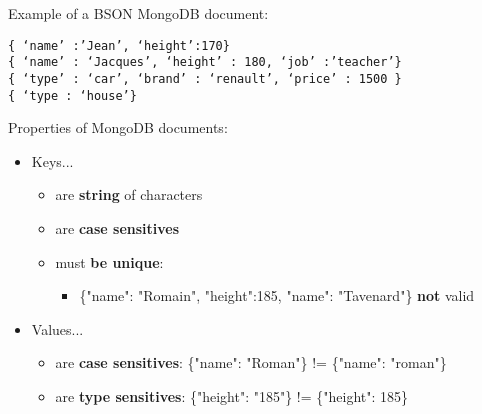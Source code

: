 \documentclass{beamer}[10pt, usepdftitle=false handout]
\begin{document}
	\begin{frame}[fragile]
	
Example of a BSON MongoDB document:
\vspace*{0.6em}

\begin{verbatim}
{ ‘name’ :’Jean’, ‘height’:170}
{ ‘name’ : ‘Jacques’, ‘height’ : 180, ‘job’ :’teacher’}
{ ‘type’ : ‘car’, ‘brand’ : ‘renault’, ‘price’ : 1500 }
{ ‘type : ‘house’}
\end{verbatim}
	
	\end{frame}
	\begin{frame}
	Properties of MongoDB documents:
	\vspace*{0.6em}
	
	\begin{itemize}
	\item{Keys...
		\begin{itemize}
			\item{are \textbf{string} of characters}
			\item{are \textbf{case sensitives}}
			\item{must \textbf{be unique}: 
				\begin{itemize}
					\item{\{"name": "Romain", "height":185, "name": "Tavenard"\} \textbf{not} valid}	
				\end{itemize}							
			}
		\end{itemize}			
	}
	\item{Values...
		\begin{itemize}
			\item{are \textbf{case sensitives}:  \{"name": "Roman"\} != \{"name": "roman"\}}
			\item{are \textbf{type sensitives}:  \{"height": "185"\} != \{"height": 185\}}
		\end{itemize}			
	}
	
	\end{itemize}
	
	\end{frame}
\end{document}
